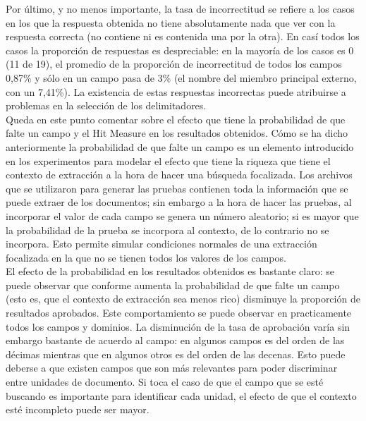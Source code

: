 Por último, y no menos importante, la tasa de incorrectitud se refiere a los casos en los que la respuesta obtenida no tiene absolutamente nada que ver con la respuesta correcta (no contiene ni es contenida una por la otra). En casí todos los casos la proporción de respuestas es despreciable: en la mayoría de los casos es 0 (11 de 19),  el promedio de la proporción de incorrectitud de todos los campos 0,87\% y sólo en un campo pasa de 3\% (el nombre del miembro principal externo, con un 7,41\%). La existencia de estas respuestas incorrectas puede atribuirse a problemas en la selección de los delimitadores. \\

Queda en este punto comentar sobre el efecto que tiene la probabilidad de que falte un campo y el Hit Measure en los resultados obtenidos. Cómo se ha dicho anteriormente la probabilidad de que falte un campo es un elemento introducido en los experimentos para modelar el efecto que tiene la riqueza que tiene el contexto de extracción a la hora de hacer una búsqueda focalizada. Los archivos que se utilizaron para generar las pruebas contienen toda la información que se puede extraer de los documentos; sin embargo a la hora de hacer las pruebas, al incorporar el valor de cada campo se genera un número aleatorio; si es mayor que la probabilidad de la prueba se incorpora al contexto, de lo contrario no se incorpora. Esto permite simular condiciones normales de una extracción focalizada en la que no se tienen todos los valores de los campos. \\

El efecto de la probabilidad en los resultados obtenidos es bastante claro: se puede observar que conforme aumenta la probabilidad de que falte un campo (esto es, que el contexto de extracción sea menos rico) disminuye la proporción de resultados aprobados. Este comportamiento se puede observar en practicamente todos los campos y dominios. La disminución de la tasa de aprobación varía sin embargo bastante de acuerdo al campo: en algunos campos es del orden de las décimas mientras que en algunos otros es del orden de las decenas. Esto puede deberse a que existen campos que son más relevantes para poder discriminar entre unidades de documento. Si toca el caso de que el campo que se esté buscando es importante para identificar cada unidad, el efecto de que el contexto esté incompleto puede ser mayor. \\

